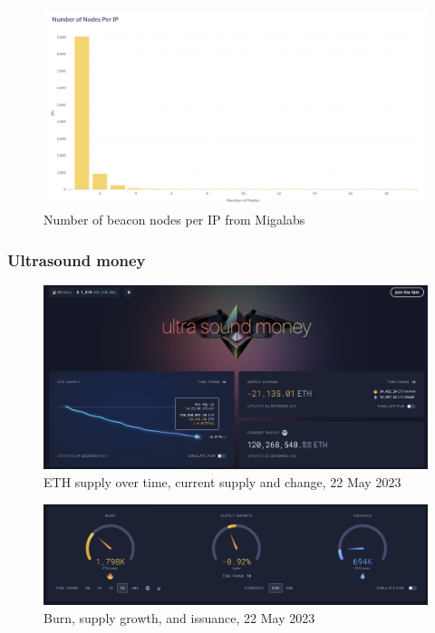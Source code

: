 \documentclass[UTF8]{article}
\begin{document}
{\begin{figure}[htbp]
\begin{center}
\includegraphics[width=0.48\linewidth]{images/ipdist}
\caption{Number of beacon nodes per IP from Migalabs }
\label{fig:ipdist}
\end{center}
\end{figure}
\clearpage
\subsubsection*{Ultrasound money}

\begin{figure}[htbp]
\begin{center}
\includegraphics[width=0.9\linewidth]{images/ethsupply}
\caption{ETH supply over time, current supply and change, 22 May 2023}
\label{fig:ethsupply}
\end{center}
\end{figure}

\begin{figure}[htbp]
\begin{center}
\includegraphics[width=0.9\linewidth]{images/burn}
\caption{Burn, supply growth, and issuance, 22 May 2023}
\label{fig:burn}
\end{center}
\end{figure}

}
\end{document}
